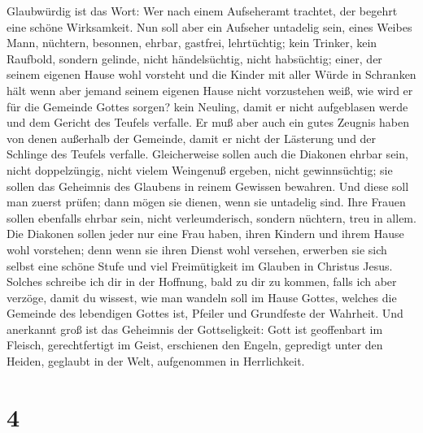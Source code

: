  Glaubwürdig ist das Wort: Wer nach einem Aufseheramt
trachtet, der begehrt eine schöne Wirksamkeit.  Nun soll
aber ein Aufseher untadelig sein, eines Weibes Mann, nüchtern, besonnen,
ehrbar, gastfrei, lehrtüchtig;  kein Trinker, kein
Raufbold, sondern gelinde, nicht händelsüchtig, nicht habsüchtig;
 einer, der seinem eigenen Hause wohl vorsteht und die
Kinder mit aller Würde in Schranken hält  wenn aber jemand
seinem eigenen Hause nicht vorzustehen weiß, wie wird er für die
Gemeinde Gottes sorgen?  kein Neuling, damit er nicht
aufgeblasen werde und dem Gericht des Teufels verfalle. 
Er muß aber auch ein gutes Zeugnis haben von denen außerhalb der
Gemeinde, damit er nicht der Lästerung und der Schlinge des Teufels
verfalle.  Gleicherweise sollen auch die Diakonen ehrbar
sein, nicht doppelzüngig, nicht vielem Weingenuß ergeben, nicht
gewinnsüchtig;  sie sollen das Geheimnis des Glaubens in
reinem Gewissen bewahren.  Und diese soll man zuerst
prüfen; dann mögen sie dienen, wenn sie untadelig sind. 
Ihre Frauen sollen ebenfalls ehrbar sein, nicht verleumderisch, sondern
nüchtern, treu in allem.  Die Diakonen sollen jeder nur
eine Frau haben, ihren Kindern und ihrem Hause wohl vorstehen;
 denn wenn sie ihren Dienst wohl versehen, erwerben sie
sich selbst eine schöne Stufe und viel Freimütigkeit im Glauben in
Christus Jesus.  Solches schreibe ich dir in der
Hoffnung, bald zu dir zu kommen,  falls ich aber verzöge,
damit du wissest, wie man wandeln soll im Hause Gottes, welches die
Gemeinde des lebendigen Gottes ist, Pfeiler und Grundfeste der Wahrheit.
 Und anerkannt groß ist das Geheimnis der Gottseligkeit:
Gott ist geoffenbart im Fleisch, gerechtfertigt im Geist, erschienen den
Engeln, gepredigt unter den Heiden, geglaubt in der Welt, aufgenommen in
Herrlichkeit.

\hypertarget{section-3}{%
\section{4}\label{section-3}}

